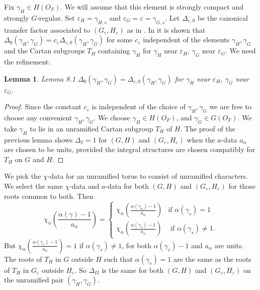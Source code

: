 \documentclass[11pt]{amsart}
\theoremstyle{plain}
\newtheorem{lemma}[theorem]{Lemma}
\theoremstyle{definition}
\def\varep{\varepsilon}
\def\LANGLANDSD{22}
\begin{document}
Fix $\gamma_H\in H(O_F)$. We will assume that this element is
strongly compact and strongly $G$-regular. Set $\varep_H=\gamma_{H,s}$
and $\varep_G=\varep=\gamma_{G,s}$.  Let $\Delta_{\varep,0}$
be the canonical transfer factor associated to $(G_\varep,H_{\varep})$
as in \cite{\LANGLANDSD}.  In \cite{\LANGLANDSD} it is shown that
$\Delta_0(\gamma_H,\gamma_G) = c_\varep\Delta_{\varep,0}(
\gamma_H,\gamma_G)$ for some $c_\varep$ independent of the 
elements $\gamma_H, \gamma_G$ and the Cartan subgroups $T_H$
containing $\gamma_H$ for $\gamma_H$ near $\varep_H$, 
$\gamma_G$ near $\varep_G$.  We need the refinement:

\begin{lemma}{Lemma 8.1} $\Delta_0(\gamma_H,\gamma_G) =
\Delta_{\varep,0}(\gamma_H,\gamma_G)$ for
$\gamma_H$ near $\varep_H$, $\gamma_G$ near $\varep_G$.
\end{lemma}

\begin{proof}  Since the constant $c_\varep$ 
is independent of the choice of $\gamma_H,\gamma_G$
we are free to choose any convenient
$\gamma_H,\gamma_G$.  We choose
$\gamma_H\in H(O_F)$, and $\gamma_G\in G(O_F)$.
We take $\gamma_H$ to lie in an unramified Cartan subgroup $T_H$ of $H$.
The proof of the previous lemma shows
$\Delta_I=1$ for $(G,H)$ and $(G_\varep,H_\varep)$ when 
the $a$-data $a_\alpha$ are chosen to be units, provided
the integral structures are chosen compatibly for $T_H$ on $G$ and $H$.
\end{proof}

We pick the $\chi$-data for an unramified torus to 
consist of unramified characters.  We select the same
$\chi$-data and $a$-data for both $(G,H)$ and
$(G_\varep,H_\varep)$ for those roots common to both.
Then 
$$
\chi_\alpha\left(
\frac{\alpha(\gamma)-1}
    {a_\alpha}
\right)
=\begin{cases}
\chi_\alpha\left(
\frac{\alpha(\gamma_u)-1}
    {a_\alpha}
\right)
&\text{if } \alpha(\gamma_s) = 1\\
\chi_\alpha\left(
\frac{\alpha(\gamma_s)-1}
    {a_\alpha}
\right)
&\text{ if }\alpha(\gamma_s)\ne 1.
\end{cases}
$$
But $\chi_\alpha\left(
\frac{\alpha(\gamma_s)-1}
    {a_\alpha}
\right)=1$ if $\alpha(\gamma_s)\ne 1$,
for both $\alpha(\gamma_s)-1$ and $a_\alpha$
are units.  The roots of $T_H$ in $G$ outside $H$
such that $\alpha(\gamma_s)=1$ are the same as
the roots of $T_H$ in $G_\varep$ outside
$H_{\varep}$.  So
$\Delta_{II}$ is the same for both 
$(G,H)$ and $(G_\varep,H_{\varep})$ on the
unramified pair $(\gamma_H,\gamma_G)$.
\end{document}
